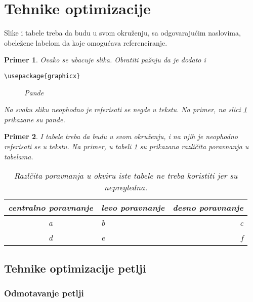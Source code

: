 \documentclass[a4paper]{article}
\newtheorem{primer}{Primer}[section]
\begin{document}
{\section{Tehnike optimizacije}
\label{sec:tehnike}

Slike i tabele treba da budu u svom okruženju, sa odgovarajućim naslovima, obeležene labelom da koje omogućava referenciranje. 

\begin{primer} Ovako se ubacuje slika. Obratiti pažnju da je dodato i 
\begin{verbatim}
\usepackage{graphicx}
\end{verbatim}

\begin{figure}[h!]
\begin{center}
\end{center}
\caption{Pande}
\label{fig:pande}
\end{figure}

Na svaku sliku neophodno je referisati se negde u tekstu. Na primer, na slici \ref{fig:pande} prikazane su pande. 
\end{primer}

\begin{primer} I tabele treba da budu u svom okruženju, i na njih je neophodno referisati se u tekstu. Na primer, u tabeli \ref{tab:tabela1} su prikazana različita poravnanja u tabelama.

\begin{table}[h!]
\begin{center}
\caption{Razlčita poravnanja u okviru iste tabele ne treba koristiti jer su nepregledna.}
\begin{tabular}{|c|l|r|} \hline
centralno poravnanje& levo poravnanje& desno poravnanje\\ \hline
a &b&c\\ \hline
d &e&f\\ \hline
\end{tabular}
\label{tab:tabela1}
\end{center}
\end{table}

\end{primer}

\subsection{Tehnike optimizacije petlji}
\subsubsection{Odmotavanje petlji}
}
\end{document}
